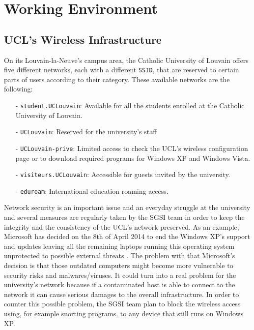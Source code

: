 
\chapter{Working Environment} %

\label{Chapter2} %




\section{UCL's Wireless Infrastructure}

On its Louvain-la-Neuve's campus area, the Catholic University of Louvain offers five different networks, each with a different \texttt{SSID}, that are reserved to certain parts of users according to their category. These available networks are the following:
\begin{itemize}
	\item[-] \texttt{student.UCLouvain}: Available for all the students enrolled at the Catholic University of Louvain.
	\item[-] \texttt{UCLouvain}: Reserved for the university's staff
	\item[-] \texttt{UCLouvain-prive}: Limited access to check the UCL's wireless configuration page or to download required programs for Windows XP and Windows Vista.
	\item[-] \texttt{visiteurs.UCLouvain}: Accessible for guests invited by the university.
	\item[-] \texttt{eduroam}: International education roaming access.
\end{itemize}

Network security is an important issue and an everyday struggle at the university and several measures are regularly taken by the SGSI team in order to keep the integrity and the consistency of the UCL's network preserved. As an example, Microsoft has decided on the 8th of April 2014 to end the Windows XP's support and updates leaving all the remaining laptops running this operating system unprotected to possible external threats \cite{windows}. The problem with that Microsoft's decision is that those outdated computers might become more vulnerable to security risks and malwares/viruses. It could turn into a real problem for the university's network because if a contaminated host is able to connect to the network it can cause serious damages to the overall infrastructure. In order to counter this possible problem, the SGSI team plan to block the wireless access using, for example snorting programs, to any device that still runs on Windows XP.

